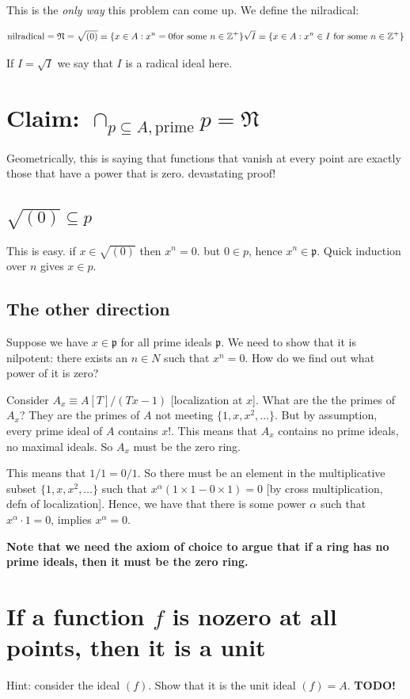 \documentclass{book}
\newcommand{\Z}{\ensuremath{\mathbb{Z}}}
\newcommand{\p}{\mathfrak{p}}
\theoremstyle{definition}
\begin{document}
This is the \emph{only way} this problem can come up. We define
the nilradical:

$$
\text{nilradical} = \mathfrak N = \sqrt{(0)} \equiv \{ x \in A : x^n = 0 \text{for some } n \in \Z^+ \} \\
\sqrt{I} \equiv \{ x \in A : x^n \in I \text{ for some } n \in \Z^+ \}
$$

If $I = \sqrt{I}$ we say that $I$ is a radical ideal here.


\section{Claim: $\cap_{p \subseteq A, \text{prime}} p = \mathfrak N$}
Geometrically, this is saying that functions that vanish at every point
are exactly those that have a power that is zero.  devastating proof!

\subsection{$\sqrt{(0)} \subseteq p$} This is easy. if $x \in \sqrt{(0)}$
then $x^n = 0$. but $0 \in p$, hence $x^n \in \p$. Quick induction over
$n$ gives $x \in p$.

\subsection{The other direction}
Suppose we have $x \in \p$ for all prime ideals $\p$. We need
to show that it is nilpotent: there exists an $n \in N$ such that $x^n = 0$.
How do we find out what power of it is zero?

Consider $A_x \equiv A[T]/(Tx - 1)$ [localization at $x$]. What are the
the primes of $A_x$? They are the primes of $A$ not meeting $\{1, x, x^2, \dots \}$.
But by assumption, every prime  ideal of $A$ contains $x$!. This means that
$A_x$ contains no prime ideals, no maximal ideals. So $A_x$ must be the zero ring.

This means that $1/1 = 0/1$.  So there must be an element in the multiplicative
subset $\{1, x, x^2, \dots \}$ such that $x^\alpha(1\times 1 - 0 \times 1) = 0$ [by cross multiplication, defn of localization].
Hence, we have that there is some power $\alpha$ such that $x^\alpha \cdot 1 = 0$,
implies $x^\alpha = 0$.


\textbf{Note that we need the axiom of choice to argue that if a ring has no prime ideals,
then it must be the zero ring.}

\section{If a function $f$ is nozero at all points, then it is a unit}
Hint: consider the ideal $(f)$. Show that it is the unit ideal $(f) = A$.
\textbf{TODO!}
\end{document}
